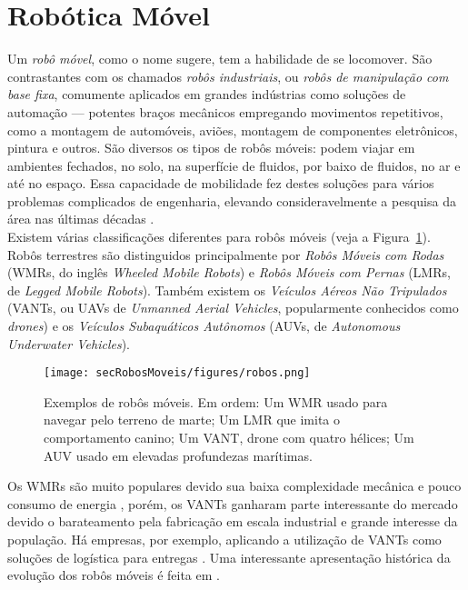 \section{Robótica Móvel\label{sec:robos}}

Um \textit{robô móvel}, como o nome sugere, tem a habilidade de se locomover. São contrastantes com os chamados \textit{robôs industriais}, ou \textit{robôs de manipulação com base fixa}, comumente aplicados em grandes indústrias como soluções de automação --- potentes braços mecânicos empregando movimentos repetitivos, como a montagem de automóveis, aviões, montagem de componentes eletrônicos, pintura e outros.  São diversos os tipos de robôs móveis: podem viajar em ambientes fechados, no solo, na superfície de fluidos, por baixo de fluidos, no ar e até no espaço. Essa capacidade de mobilidade fez destes soluções para vários problemas complicados de engenharia, elevando consideravelmente a pesquisa da área nas últimas décadas \cite{mobileRobotsCook}.
\\

Existem várias classificações diferentes para robôs móveis \cite{mobileRobotsTzafestas} (veja a Figura~\ref{fig:robosmoveis}). Robôs terrestres são distinguidos principalmente por \textit{Robôs Móveis com Rodas} (WMRs, do inglês \textit{Wheeled Mobile Robots}) e \textit{Robôs Móveis com Pernas} (LMRs, de \textit{Legged Mobile Robots}). Também existem os \textit{Veículos Aéreos Não Tripulados} (VANTs, ou UAVs de \textit{Unmanned Aerial Vehicles}, popularmente conhecidos como \textit{drones}) e os \textit{Veículos Subaquáticos Autônomos} (AUVs, de \textit{Autonomous Underwater Vehicles}). 

\begin{figure}[H]
	\begin{center}
		\texttt{[image: secRobosMoveis/figures/robos.png]}
	\end{center}
	\caption{Exemplos de robôs móveis. Em ordem: Um WMR usado para navegar pelo terreno de marte; Um LMR que imita o comportamento canino; Um VANT, drone com quatro hélices; Um AUV usado em elevadas profundezas marítimas.}
	\label{fig:robosmoveis}
\end{figure}

Os WMRs são muito populares devido sua baixa complexidade mecânica e pouco consumo de energia \cite{mobileRobotsWheeled}, porém, os VANTs ganharam parte interessante do mercado devido o barateamento pela fabricação em escala industrial e grande interesse da população. Há empresas, por exemplo, aplicando a utilização de VANTs como soluções de logística para entregas \cite{dronesAmazon}. Uma interessante apresentação histórica da evolução dos robôs móveis é feita em \cite{mobileRobotsTzafestas}.

